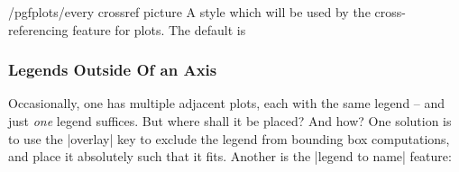 \begin{stylekey}{/pgfplots/every crossref picture}
	A style which will be used by the cross-referencing feature for plots. The default is
\begin{codeexample}
\end{codeexample}
\end{stylekey}


\subsubsection{Legends Outside Of an Axis}
Occasionally, one has multiple adjacent plots, each with the same legend -- and just \emph{one} legend suffices. But where shall it be placed? And how? One solution is to use the |overlay| key to exclude the legend from bounding box computations, and place it absolutely such that it fits. Another is the |legend to name| feature:

